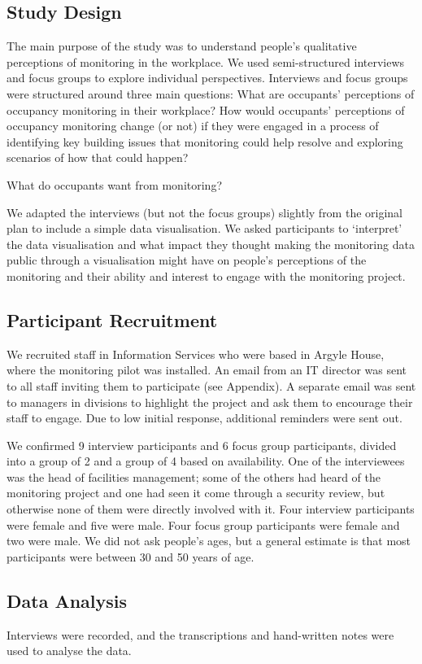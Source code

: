 
\subsection{Study Design}
\label{sec:study-design}


The main purpose of the study was to understand people’s qualitative perceptions of monitoring in the workplace. We used semi-structured interviews and focus groups to explore individual perspectives.
Interviews and focus groups were structured around three main questions:
What are occupants’ perceptions of occupancy monitoring in their workplace?
How would occupants’ perceptions of occupancy monitoring change (or not) if they were engaged in a process of identifying key building issues that monitoring could help resolve and exploring scenarios of how that could happen?

What do occupants want from monitoring?

We adapted the interviews (but not the focus groups) slightly from the original plan to include a simple data visualisation. We asked participants to ‘interpret’ the data visualisation and what impact they thought making the monitoring data public through a visualisation might have on people’s perceptions of the monitoring and their ability and interest to engage with the monitoring project.

\subsection{Participant Recruitment}
\label{sec:recruitment}

We recruited staff in Information Services who were based in Argyle House, where the monitoring pilot was installed. An email from an IT director was sent to all staff inviting them to participate (see Appendix). A separate email was sent to managers in divisions to highlight the project and ask them to encourage their staff to engage. Due to low initial response, additional reminders were sent out.

We confirmed 9 interview participants and 6 focus group participants, divided into a group of 2 and a group of 4 based on availability. One of the interviewees was the head of facilities management; some of the others had heard of the monitoring project and one had seen it come through a security review, but otherwise none of them were directly involved with it. Four interview participants were female and five were male. Four focus group participants were female and two were male. We did not ask people’s ages, but a general estimate is that most participants were between 30 and 50 years of age.

\subsection{Data Analysis}
\label{sec:data-analysis}


Interviews were recorded, and the transcriptions and hand-written notes were used to analyse the data.
